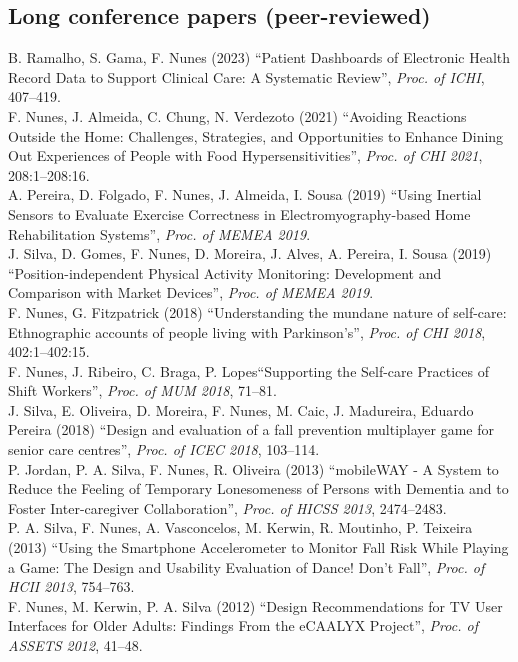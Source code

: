 \documentclass[11pt, a4paper]{article} %
\newcommand{\years}[1]{\marginnote{\scriptsize #1}} %
\begin{document}
\subsection*{Long conference papers (peer-reviewed)}
\years{2023}B. Ramalho, S. Gama, F. Nunes (2023) ``Patient Dashboards of Electronic Health Record Data to Support Clinical Care: A Systematic Review'', \emph{Proc. of ICHI}, 407--419.\\
\years{2021}F. Nunes, J. Almeida, C. Chung, N. Verdezoto (2021) ``Avoiding Reactions Outside the Home: Challenges, Strategies, and Opportunities to Enhance Dining Out Experiences of People with Food Hypersensitivities'', \emph{Proc. of CHI 2021}, 208:1--208:16.\\
\years{2019}A. Pereira, D. Folgado, F. Nunes, J. Almeida, I. Sousa (2019) ``Using Inertial Sensors to Evaluate Exercise Correctness in Electromyography-based Home Rehabilitation Systems'', \emph{Proc. of MEMEA 2019}.\\
\years{2019}J. Silva, D. Gomes, F. Nunes, D. Moreira, J. Alves, A. Pereira, I. Sousa (2019) ``Position-independent Physical Activity Monitoring: Development and Comparison with Market Devices'', \emph{Proc. of MEMEA 2019}.\\
\years{2018}F. Nunes, G. Fitzpatrick (2018) ``Understanding the mundane nature of self-care: Ethnographic accounts of people living with Parkinson's'', \emph{Proc. of CHI 2018}, 402:1--402:15.\\
\years{2018}F. Nunes, J. Ribeiro, C. Braga, P. Lopes``Supporting the Self-care Practices of Shift Workers'', \emph{Proc. of MUM 2018}, 71--81.\\
\years{2018}J. Silva, E. Oliveira, D. Moreira, F. Nunes, M. Caic, J. Madureira, Eduardo Pereira (2018) ``Design and evaluation of a fall prevention multiplayer game for senior care centres'', \emph{Proc. of ICEC 2018}, 103--114.\\
\years{2013}P. Jordan, P. A. Silva, F. Nunes, R. Oliveira (2013) ``mobileWAY - A System to Reduce the Feeling of Temporary Lonesomeness of Persons with Dementia and to Foster Inter-caregiver Collaboration'', \emph{Proc. of HICSS 2013}, 2474--2483.\\
\years{2013}P. A. Silva, F. Nunes, A. Vasconcelos, M. Kerwin, R. Moutinho, P. Teixeira (2013) ``Using the Smartphone Accelerometer to Monitor Fall Risk While Playing a Game: The Design and Usability Evaluation of Dance! Don't Fall'', \emph{Proc. of HCII 2013}, 754--763.\\
\years{2012}F. Nunes, M. Kerwin, P. A. Silva (2012) ``Design Recommendations for TV User Interfaces for Older Adults: Findings From the eCAALYX Project'', \emph{Proc. of ASSETS 2012}, 41--48.\\
\end{document}
